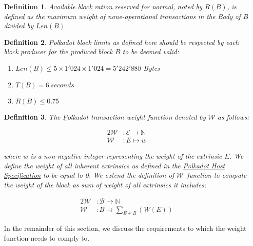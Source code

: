 \documentclass[11pt,a4paper]{article}
\newtheorem{definition}{Definition}
\newcommand{\TWF}{\ensuremath{\mathcal{W}}}
\begin{document}
\begin{definition}
  \label{def:block-target-time}
  Available block ration reserved for normal, noted by $R(B)$, is defined as the
  maximum weight of none-operational transactions in the Body of $B$ divided by
  $Len(B)$.
\end{definition}

\begin{definition}
  \label{def:polkadot-block-limits}
        {\b Polkadot block limits} as defined here should be respected by each
        block producer for the produced block $B$ to be deemed valid:
        
        \begin{enumerate}
         \item $Len(B) \le 5 \times 1'024 \times 1'024 = 5'242'880$ Bytes
         \item $T(B) = 6\ seconds$
         \item $R(B) \le 0.75$
        \end{enumerate}
        
\end{definition}

\begin{definition}
  \label{defn:weight-function}
  The {\b Polkadot transaction weight function} denoted by $\mathcal{W}$ as follows:

  \begin{alignat*}{2}
    \mathcal{W} &: \mathcal{E} \rightarrow \mathbb{N} \\
    \mathcal{W} &: E \mapsto w
  \end{alignat*}

  where $w$ is a non-negative integer representing the weight of the extrinsic
  $E$. We define the weight of all inherent extrinsics as defined in the
  \href{https://github.com/w3f/polkadot-spec/tree/master/host-spec}{Polkadot
  Host Specification} to be equal to 0. We extend the definition of \TWF\
  function to compute the weight of the block as sum of weight of all extrinsics
  it includes:

  \begin{alignat*}{2}
    \mathcal{W} &: \mathcal{B}\rightarrow \mathbb{N} \\
    \mathcal{W} &: B \mapsto \sum_{E\in B}(W(E))
  \end{alignat*}
  
\end{definition}

In the remainder of this section, we discuss the requirements to which the
weight function needs to comply to.
\end{document}
